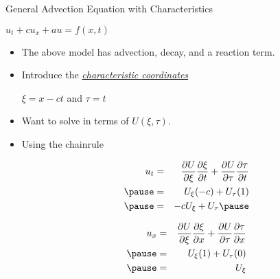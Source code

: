 \documentclass[t,10pt,fleqn]{beamer}
\def\d{\partial}
\newcommand{\tu}[1]{\underline{\textit{#1}}}
\begin{document}
 \begin{frame}{}

 \pause 
 
  \begin{block}{General Advection Equation with Characteristics}
  
            \begin{center}
            $ u_t + c u_x +au = f(x,t)$ 
           \end{center}
 \vspace{-3ex}
 
  \begin{itemize}

     \pause
     \item  The above model has advection, decay, and a reaction term.
          \pause
     \item Introduce the \tu{characteristic coordinates}
            \begin{center}
            $ \xi = x-ct$ and $\tau = t$ 
     \end{center}
     \pause
     \item  Want to solve in terms of $U(\xi, \tau)$.       
     \pause
     \item Using the chainrule 


\vspace{-1ex}
     \begin{minipage}{.4\textwidth} %
     \begin{eqnarray*} 
            u_t & =  & \frac{ \d U}{\d \xi}   \frac{ \d \xi}{\d t}  +  \frac{ \d U}{\d \tau}   \frac{ \d \tau}{\d t}   \\ \pause
                  & =  &U_{\xi}  (-c)  + U_{\tau}  (1)    \\ \pause
                   & =  &-c U_{\xi}   + U_{\tau}  \pause
      \end{eqnarray*}
      \end{minipage} %
  \begin{minipage}{.4\textwidth} %
     \begin{eqnarray*} 
            u_x & =  & \frac{ \d U}{\d \xi}   \frac{ \d \xi}{\d x}  +  \frac{ \d U}{\d \tau}   \frac{ \d \tau}{\d x}   \\ \pause
                  & =  &U_{\xi} (1)  + U_{\tau}  (0)    \\ \pause
                   & =  &U_{\xi}  
      \end{eqnarray*}
 \end{minipage} %
 

\end{itemize}
\end{block}
\end{frame}
\end{document}
